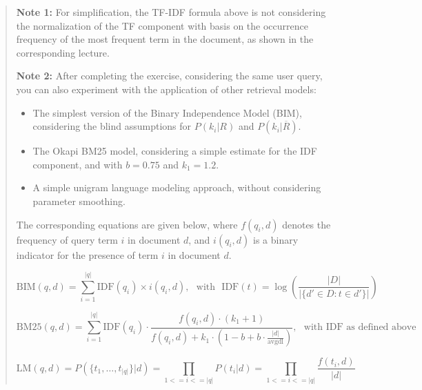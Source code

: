 \documentclass[12pt]{article}
\begin{document}
\begin{quote}
    \textbf{Note 1:} For simplification, the TF-IDF formula above is not considering the normalization of the TF component with basis on the occurrence frequency of the most frequent term in the document, as shown in the corresponding lecture.
    
    \textbf{Note 2:} After completing the exercise, considering the same user query, you can also experiment with the application of other retrieval models:
    \begin{itemize}
    \item The simplest version of the Binary Independence Model (BIM), considering the blind assumptions for $P(k_i|R)$ and $P(k_i|\overline{R})$.
    \item The Okapi BM25 model, considering a simple estimate for the IDF component, and with $b=0.75$ and $k_1=1.2$.
    \item A simple unigram language modeling approach, without considering parameter smoothing.
    \end{itemize}
    The corresponding equations are given below, where $f(q_{i},d)$ denotes the frequency of query term $i$ in document $d$, and $i(q_{i},d)$ is a binary indicator for the presence of term $i$ in document $d$.
    
    \begin{center}
    \begin{equation*}
	\mathrm{BIM}(q,d) = \sum _{i=1}^{|q|} \mathrm{IDF}(q_i) \times i(q_{i},d), \text{~~with~~} \mathrm{IDF}(t) = \log \left( \frac{|D|}{|\{d' \in D: t \in d'\}|} \right)
	\end{equation*}
    \end{center}
    
    \begin{center}
    \begin{equation*}
{ {\text{BM25}}(q,d)=\sum _{i=1}^{|q|}{\text{IDF}}({q_i})\cdot {\frac {f(q_{i},d)\cdot (k_{1}+1)}{f(q_{i},d)+k_{1}\cdot \left(1-b+b\cdot {\frac {|d|}{\text{avgdl}}}\right)}},} \text{~~with IDF as defined above}
    \end{equation*}
    \end{center}
    
    \begin{center}
    \begin{equation*}
	\mathrm{LM}(q,d) = P(\{t_1,\ldots,t_{|q|}\}|d) = \prod_{1<=i<=|q|} P(t_i|d) = \prod_{1<=i<=|q|} \frac{f(t_i,d)}{|d|}
	\end{equation*}
    \end{center}
\end{quote}
\end{document}
